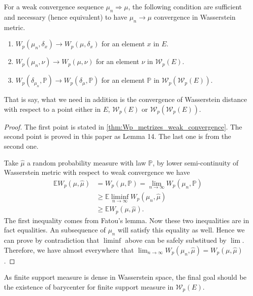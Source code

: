 \begin{prop}
	For a weak convergence sequence $\mu_n \Rightarrow \mu$, the following condition are sufficient and necessary (hence equivalent) to have $\mu_n \rightarrow \mu$ convergence in Wasserstein metric.
	\begin{enumerate}
		\item $W_p(\mu_n, \delta_x) \rightarrow W_p(\mu, \delta_x)$ for an element $x$ in $E$.
		\item $W_p(\mu_n, \nu) \rightarrow W_p(\mu, \nu)$ for an element $\nu$ in $\mathcal{W}_p(E)$.
		\item $W_p(\delta_{\mu_n}, \mathbb{P}) \rightarrow W_p(\delta_\mu, \mathbb{P})$ for an element $\mathbb{P}$ in $\mathcal{W}_p(\mathcal{W}_p(E))$.
	\end{enumerate}
\end{prop}

That is say, what we need in addition is the convergence of Wasserstein distance with respect to a point either in $E$, $\mathcal{W}_p(E)$ or $\mathcal{W}_p(\mathcal{W}_p(E))$.

\begin{proof}
	The first point is stated in \cref{thm:Wp_metrizes_weak_convergence}. The second point is proved in this paper as Lemma 14. The last one is from the second one.

	Take $\hat{\mu}$ a random probability measure with law $\mathbb{P}$, by lower semi-continuity of Wasserstein metric with respect to weak convergence we have
	\begin{align*}
		\mathbb{E}W_p(\mu, \hat{\mu}) & =W_p(\mu, \mathbb{P})=\lim_{n \rightarrow \infty} W_p(\mu_n, \mathbb{P}) \\
		                              & \geq \mathbb{E}\liminf_{n \rightarrow \infty} W_p(\mu_n, \hat{\mu})      \\
		                              & \geq \mathbb{E}W_p(\mu, \hat{\mu}).
	\end{align*}
	The first inequality comes from Fatou's lemma. Now these two inequalities are in fact equalities. An subsequence of $\mu_n$ will satisfy this equality as well. Hence we can prove by contradiction that $\liminf$ above can be safely substitued by $\lim$.
	Therefore, we have almost everywhere that $\lim_{n \rightarrow \infty} W_p(\mu_n, \hat{\mu})=W_p(\mu, \hat{\mu})$.
\end{proof}

As finite support measure is dense in Wasserstein space, the final goal should be the existence of barycenter for finite support measure in $\mathcal{W}_p(E)$.


